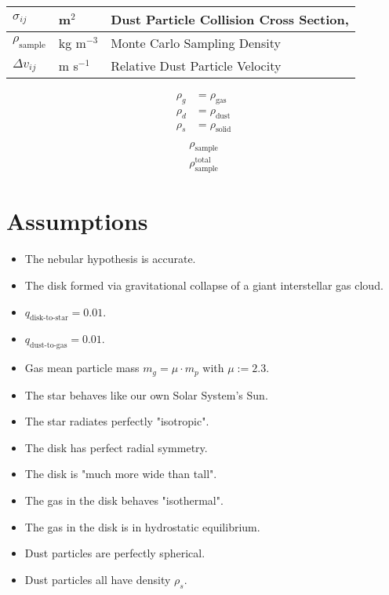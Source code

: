 \begin{table}[h!]
\begin{tabular}{|l|l|l|}
            \\ \hline
            $\sigma_{ij}$       & m$^2$                 & Dust Particle Collision Cross Section,
            \\ \hline
            $\rho_\text{sample}$& kg m$^{-3}$           & Monte Carlo Sampling Density
            \\ \hline
            $\Delta v_{ij}$     & m s$^{-1}$            & Relative Dust Particle Velocity
            \\ \hline
        \end{tabular}
    \end{table}

    \begin{align}
        \rho_g &= \rho_\text{gas} \\
        \rho_d &= \rho_\text{dust} \\
        \rho_s &= \rho_\text{solid} \\
    \end{align}
    \begin{align}
        \rho_\text{sample} \\
        \rho_\text{sample}^\text{total} 
    \end{align}
    
\section{Assumptions}

    \begin{itemize}
        \item The nebular hypothesis is accurate. 
        \item The disk formed via gravitational collapse of a giant interstellar gas cloud.
        \item $q_\text{disk-to-star}=0.01$.
        \item $q_\text{dust-to-gas}=0.01$.
        \item Gas mean particle mass $m_g=\mu\cdot m_p$ with $\mu:=2.3$.
        \item The star behaves like our own Solar System's Sun.
        \item The star radiates perfectly "isotropic".
        \item The disk has perfect radial symmetry.
        \item The disk is "much more wide than tall".
        \item The gas in the disk behaves "isothermal".
        \item The gas in the disk is in hydrostatic equilibrium.
        \item Dust particles are perfectly spherical.
        \item Dust particles all have density $\rho_s$.
    \end{itemize}

